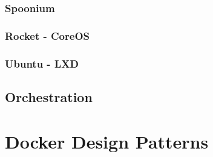 \subsubsection{Spoonium}
\subsubsection{Rocket - CoreOS}
\subsubsection{Ubuntu - LXD}

\subsection{Orchestration}


\section{Docker Design Patterns}\label{ch2:patterns}


